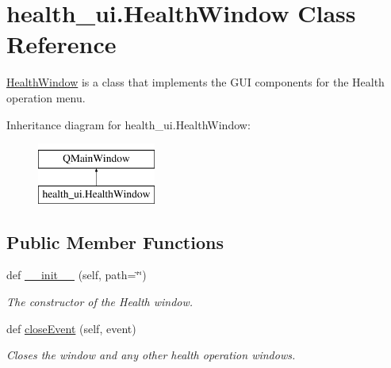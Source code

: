 \hypertarget{classhealth__ui_1_1_health_window}{}\section{health\+\_\+ui.\+Health\+Window Class Reference}
\label{classhealth__ui_1_1_health_window}


\hyperlink{classhealth__ui_1_1_health_window}{Health\+Window} is a class that implements the G\+UI components for the Health operation menu.  


Inheritance diagram for health\+\_\+ui.\+Health\+Window\+:\begin{figure}[H]
\begin{center}
\leavevmode
\includegraphics[height=2.000000cm]{classhealth__ui_1_1_health_window}
\end{center}
\end{figure}
\subsection*{Public Member Functions}
\begin{DoxyCompactItemize}
\item 
def \hyperlink{classhealth__ui_1_1_health_window_aca4eb93be30367445762dc27584bfde5}{\+\_\+\+\_\+init\+\_\+\+\_\+} (self, path=\char`\"{}\char`\"{})
\begin{DoxyCompactList}\small\item\em The constructor of the Health window. \end{DoxyCompactList}\item 
\mbox{\label{classhealth__ui_1_1_health_window_a7b933fca8c05d872584f00a616dbd6de}} 
def \hyperlink{classhealth__ui_1_1_health_window_a7b933fca8c05d872584f00a616dbd6de}{close\+Event} (self, event)
\begin{DoxyCompactList}\small\item\em Closes the window and any other health operation windows. \end{DoxyCompactList}\end{DoxyCompactItemize}
